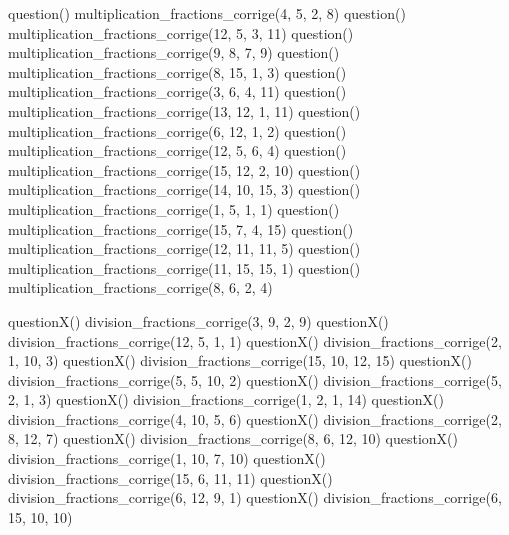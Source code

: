 \documentclass["../Cours.tex"]{subfiles}
\begin{document}
\begin{questions}
    \clearpage
    \vspace{-1.5em}
        \begin{multicols}{2}\small
        \begin{luacode}
            question() multiplication_fractions_corrige(4, 5, 2, 8)
            question() multiplication_fractions_corrige(12, 5, 3, 11)
            question() multiplication_fractions_corrige(9, 8, 7, 9)
            question() multiplication_fractions_corrige(8, 15, 1, 3)
            question() multiplication_fractions_corrige(3, 6, 4, 11)
            question() multiplication_fractions_corrige(13, 12, 1, 11)
            question() multiplication_fractions_corrige(6, 12, 1, 2)
            question() multiplication_fractions_corrige(12, 5, 6, 4)
            question() multiplication_fractions_corrige(15, 12, 2, 10)
            question() multiplication_fractions_corrige(14, 10, 15, 3)
            question() multiplication_fractions_corrige(1, 5, 1, 1)
            question() multiplication_fractions_corrige(15, 7, 4, 15)
            question() multiplication_fractions_corrige(12, 11, 11, 5)
            question() multiplication_fractions_corrige(11, 15, 15, 1)
            question() multiplication_fractions_corrige(8, 6, 2, 4)
        \end{luacode}
        \end{multicols}

    \vspace{-1.5em}
        \begin{multicols}{2}\small
        \begin{luacode}
            questionX() division_fractions_corrige(3, 9, 2, 9)
            questionX() division_fractions_corrige(12, 5, 1, 1)
            questionX() division_fractions_corrige(2, 1, 10, 3)
            questionX() division_fractions_corrige(15, 10, 12, 15)
            questionX() division_fractions_corrige(5, 5, 10, 2)
            questionX() division_fractions_corrige(5, 2, 1, 3)
            questionX() division_fractions_corrige(1, 2, 1, 14)
            questionX() division_fractions_corrige(4, 10, 5, 6)
            questionX() division_fractions_corrige(2, 8, 12, 7)
            questionX() division_fractions_corrige(8, 6, 12, 10)
            questionX() division_fractions_corrige(1, 10, 7, 10)
            questionX() division_fractions_corrige(15, 6, 11, 11)
            questionX() division_fractions_corrige(6, 12, 9, 1)
            questionX() division_fractions_corrige(6, 15, 10, 10)
        \end{luacode}
        \end{multicols}

\end{questions}
\end{document}
